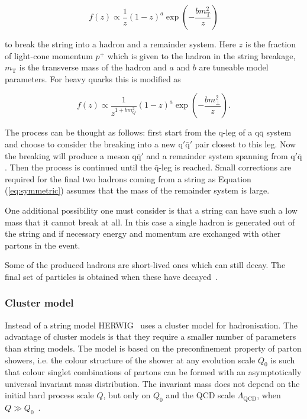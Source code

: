 \begin{equation}
f\left(z\right) \propto \frac{1}{z} \left(1-z\right)^a \exp \left(-\frac{b m_\mathrm{T} ^2}{z} \right)
\label{eq:symmetric}
\end{equation}

\noindent to break the string into a hadron and a remainder system. Here $z$ is the fraction of light-cone momentum $p^+$ which is given to the hadron in the string breakage, $m_\mathrm{T}$ is the transverse mass of the hadron and $a$ and $b$ are tuneable model parameters. For heavy quarks this is modified as 

\begin{equation}
f\left(z\right) \propto \frac{1}{z^{1+bm_Q^2}} \left(1-z\right)^a \exp \left(-\frac{b m_\perp ^2}{z} \right).
\label{eq:symmetric2}
\end{equation}

\noindent The process can be thought as follows: first start from the q-leg of a $\mathrm{q \bar{q}}$ system and choose to consider the breaking into a new $\mathrm{q' \bar q'}$ pair closest to this leg. Now the breaking will produce a meson $\mathrm{q \bar{q}'}$ and a remainder system spanning from $\mathrm{q' \bar{q}}$. Then the process is continued until the $\bar{\mathrm{q}}$-leg is reached. Small corrections are required for the final two hadrons coming from a string as Equation (\ref{eq:symmetric}) assumes that the mass of the remainder system is large.

One additional possibility one must consider is that a string can have such a low mass that it cannot break at all. In this case a single hadron is generated out of the string and if necessary  energy and momentum are exchanged with other partons in the event.

Some of the produced hadrons are short-lived ones which can still decay. The final set of particles is obtained when these have decayed~\cite{introPythia82}.


\subsubsection*{Cluster model}
Instead of a string model HERWIG~\cite{herwigManual} uses a cluster model for hadronisation. The advantage of cluster models is that they require a smaller number of parameters than string models. The model is based on the preconfinement property of parton showers, i.e. the colour structure of the shower at any evolution scale $Q_0$ is such that colour singlet combinations of partons can be formed with an asymptotically universal invariant mass distribution. The invariant mass does not depend on the initial hard process scale $Q$, but only on $Q_0$ and the QCD scale $\Lambda _ \mathrm{QCD}$, when $Q \gg Q_0$~\cite{eventGenerators}.


